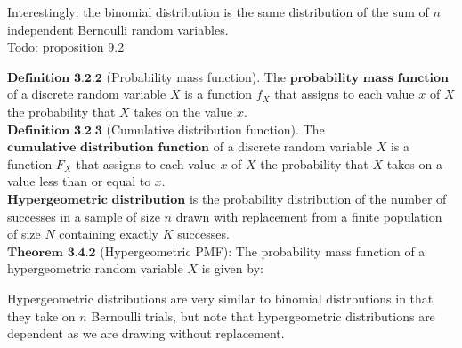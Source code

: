 \documentclass{article}
\begin{document}
    Interestingly: the binomial distribution is the same distribution of the sum of $n$ independent Bernoulli random variables. \\

    Todo: proposition 9.2

    $\textbf{Definition 3.2.2}$ (Probability mass function). The $\textbf{probability mass function}$ of a discrete random variable $X$ is a function $f_X$ that assigns to each value $x$ of $X$ the probability that $X$ takes on the value $x$.\\

    $\textbf{Definition 3.2.3}$ (Cumulative distribution function). The $\textbf{cumulative distribution function}$ of a discrete random variable $X$ is a function $F_X$ that assigns to each value $x$ of $X$ the probability that $X$ takes on a value less than or equal to $x$.\\

    $\textbf{Hypergeometric distribution}$ is the probability distribution of the number of successes in a sample of size $n$ drawn with replacement from a finite population of size $N$ containing exactly $K$ successes.\\

    $\textbf{Theorem 3.4.2}$ (Hypergeometric PMF): The probability mass function of a hypergeometric random variable $X$ is given by:

    Hypergeometric distributions are very similar to binomial distrbutions in that they take on $n$ Bernoulli trials, but note that hypergeometric distributions are dependent as we are drawing without replacement.\\
\end{document}
